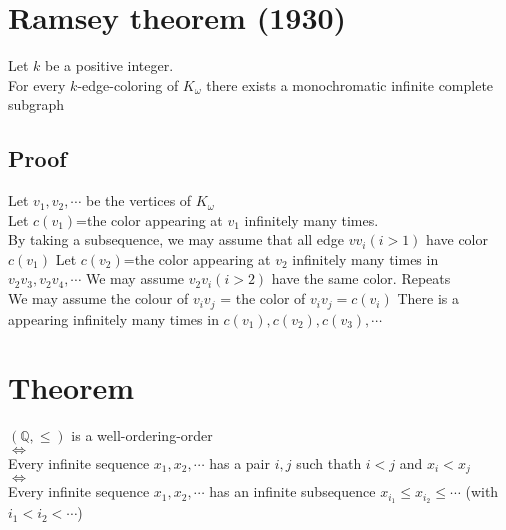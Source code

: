     \section{Ramsey theorem (1930)}
        Let $k$ be a positive integer.\\
        For every $k$-edge-coloring of $K_\omega$ there exists a monochromatic infinite complete subgraph
        \subsection{Proof}
            Let $v_1, v_2, \cdots$  be the vertices of $K_\omega$\\
            Let $c(v_1)$=the color appearing at $v_1$ infinitely many times.\\
            By taking a subsequence, we may assume that all edge $vv_i(i>1)$ have color $c(v_1)$
            Let $c(v_2)$=the color appearing at $v_2$ infinitely many times in $v_2v_3, v_2v_4, \cdots$
            We may assume $v_2v_i(i>2)$ have the same color.
            Repeats\\
            We may assume the colour of $v_iv_j$ = the color of $v_iv_j=c(v_i)$
            There is a appearing infinitely many times in $c(v_1), c(v_2), c(v_3), \cdots$
    \section{Theorem}
        $(\mathbb{Q}, \leq)$ is a well-ordering-order\\
        $\Leftrightarrow$\\
        Every infinite sequence $x_1, x_2, \cdots$ has a pair $i, j$ such thath $i<j$ and $x_i<x_j$\\
        $\Leftrightarrow$\\
        Every infinite sequence $x_1, x_2, \cdots$ has an infinite subsequence $x_i_1\leq x_i_2\leq \cdots$ (with $i_1<i_2<\cdots$)
